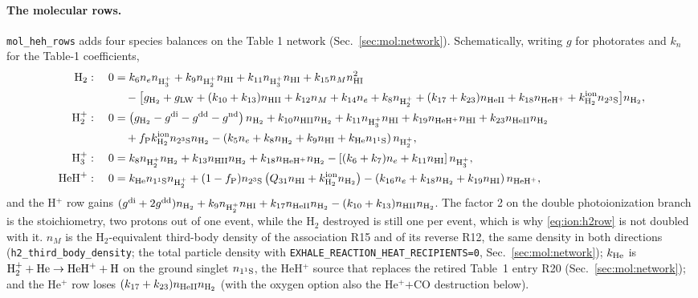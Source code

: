 \paragraph{The molecular rows.} \texttt{mol\_heh\_rows} adds four species
balances on the \citet{Koskinen2022} Table 1 network
(Sec.~\ref{sec:mol:network}). Schematically, writing $g$ for photorates and
$k_n$ for the Table-1 coefficients,
\begin{align}
\text{H}_2:\quad 0 &= k_6 n_e n_{\rm H_3^+} + k_9 n_{\rm H_2^+}n_{\rm HI}
   + k_{11}n_{\rm H_3^+}n_{\rm HI} + k_{15}n_Mn_{\rm HI}^{2}
   \nonumber\\ &\quad
   - \big[g_{\rm H_2} + g_{\rm LW} + (k_{10}+k_{13})n_{\rm HII}
          + k_{12}n_M + k_{14}n_e + k_8 n_{\rm H_2^+}
          + (k_{17}+k_{23})n_{\rm HeII} + k_{18}n_{\rm HeH^+}
          + k^{\rm ion}_{\rm H_2}n_{2^3{\rm S}}\big]n_{\rm H_2},
   \label{eq:ion:h2row}\\
\text{H}_2^+:\quad 0 &=
   \left(g_{\rm H_2}-g^{\rm di}-g^{\rm dd}-g^{\rm nd}\right)n_{\rm H_2}
   + k_{10}n_{\rm HII}n_{\rm H_2} + k_{11}n_{\rm H_3^+}n_{\rm HI}
   + k_{19}n_{\rm HeH^+}n_{\rm HI} + k_{23}n_{\rm HeII}n_{\rm H_2}
   \nonumber\\ &\quad
   + f_{\rm P}k^{\rm ion}_{\rm H_2}n_{2^3{\rm S}}n_{\rm H_2}
   - \left(k_5 n_e + k_8 n_{\rm H_2} + k_9 n_{\rm HI}
           + k_{\rm He}n_{1^1{\rm S}}\right)n_{\rm H_2^+},
   \label{eq:ion:h2prow}\\
\text{H}_3^+:\quad 0 &= k_8 n_{\rm H_2^+}n_{\rm H_2}
   + k_{13}n_{\rm HII}n_{\rm H_2} + k_{18}n_{\rm HeH^+}n_{\rm H_2}
   - \left[(k_6+k_7)n_e + k_{11}n_{\rm HI}\right]n_{\rm H_3^+},
   \label{eq:ion:h3prow}\\
\text{HeH}^+:\quad 0 &= k_{\rm He}n_{1^1{\rm S}}n_{\rm H_2^+}
   + (1-f_{\rm P})n_{2^3{\rm S}}
     \left(Q_{31}n_{\rm HI}+k^{\rm ion}_{\rm H_2}n_{\rm H_2}\right)
   - \left(k_{16}n_e+k_{18}n_{\rm H_2}+k_{19}n_{\rm HI}\right)n_{\rm HeH^+},
   \label{eq:ion:hehprow}
\end{align}
and the H$^+$ row gains
$(g^{\rm di}+2g^{\rm dd})n_{\rm H_2} + k_9 n_{\rm H_2^+}n_{\rm HI}
 + k_{17}n_{\rm HeII}n_{\rm H_2}
 - (k_{10}+k_{13})n_{\rm HII}n_{\rm H_2}$. The factor 2 on the double
photoionization branch is the stoichiometry, two protons out of one event,
while the H$_2$ destroyed is still one per event, which is why
\eqref{eq:ion:h2row} is not doubled with it. $n_M$ is the H$_2$-equivalent
third-body density of the association R15 and of its reverse R12, the same
density in both directions (\texttt{h2\_third\_body\_density}; the total
particle density with \texttt{EXHALE\_REACTION\_HEAT\_RECIPIENTS=0},
Sec.~\ref{sec:mol:network}); $k_{\rm He}$ is
${\rm H_2^+}+{\rm He}\to{\rm HeH^+}+{\rm H}$ \citep{Black1978} on the ground
singlet $n_{1^1{\rm S}}$, the HeH$^+$ source that replaces the retired
Table~1 entry R20 (Sec.~\ref{sec:mol:network}); and the He$^+$ row loses
$(k_{17}+k_{23})n_{\rm HeII}n_{\rm H_2}$ (with the oxygen option also the
He$^+$$+$CO destruction below).

